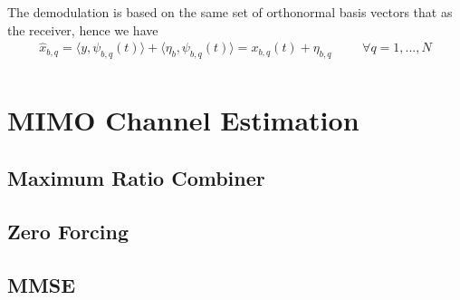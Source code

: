         The demodulation is based on the same set of orthonormal basis vectors that as the receiver, hence we have
        \begin{align*} \label{eq:InnerProductRxIdeal}
            \hat{x}_{b,q} = \langle y,\psi_{b,q}(t)\rangle + \langle\eta_{b},\psi_{b,q}(t)\rangle = x_{b,q}(t) + \eta_{b,q} & & & \forall q = 1,...,N \\
        \end{align*}


\section{MIMO Channel Estimation}\label{sec:MIMO}

\subsection{Maximum Ratio Combiner}\label{ssec:Simple}
\subsection{Zero Forcing}\label{ssec:ZF}
\subsection{MMSE}\label{ssec:MMSE}

